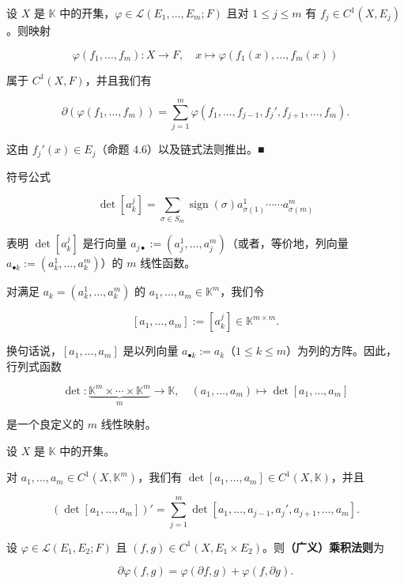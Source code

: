 \begin{corollary}

设 $ X $ 是 $ \mathbb{K} $ 中的开集，$ \varphi \in \mathcal{L}(E_1, \ldots, E_m; F) $ 且对 $ 1 \le j \le m $ 有 $ f_j \in C^1(X, E_j) $。则映射

\[
\varphi(f_1, \ldots, f_m) : X \to F , \quad x \mapsto \varphi(f_1(x), \ldots, f_m(x))
\]

属于 $ C^1(X, F) $，并且我们有

\[
\partial(\varphi(f_1, \ldots, f_m)) = \sum_{j=1}^{m}\varphi(f_1, \ldots, f_{j-1}, f_j', f_{j+1}, \ldots, f_m) .
\]

\proofhead
这由 $ f_j'(x) \in E_j $（命题 4.6）以及链式法则推出。\nobreak\hspace{0.35em}■
\end{corollary}

符号公式

\[
\det[a_k^j] = \sum_{\sigma \in S_m}\operatorname{sign}(\sigma)a_{\sigma(1)}^1 \cdots\cdots a_{\sigma(m)}^m
\]

表明 $ \det[a_k^j] $ 是行向量 $ a_{j\bullet} := (a_j^1, \ldots, a_j^m) $（或者，等价地，列向量 $ a_{\bullet k} := (a_k^1, \ldots, a_k^m) $）的 $ m $ 线性函数。

对满足 $ a_k = (a_k^1, \ldots, a_k^m) $ 的 $ a_1, \ldots, a_m \in \mathbb{K}^m $，我们令

\[
[a_1, \ldots, a_m] := [a_k^j] \in \mathbb{K}^{m \times m} .
\]

换句话说，$ [a_1, \ldots, a_m] $ 是以列向量 $ a_{\bullet k} := a_k $（$ 1 \le k \le m $）为列的方阵。因此，行列式函数

\[
\det : \underbrace{\mathbb{K}^m \times \cdots \times \mathbb{K}^m}_{m} \to \mathbb{K} , \quad (a_1, \ldots, a_m) \mapsto \det[a_1, \ldots, a_m]
\]

是一个良定义的 $ m $ 线性映射。

\begin{example}

设 $ X $ 是 $ \mathbb{K} $ 中的开集。

\begin{items}
\item

对 $ a_1, \ldots, a_m \in C^1(X, \mathbb{K}^m) $，我们有 $ \det[a_1, \ldots, a_m] \in C^1(X, \mathbb{K}) $，并且

\[
(\det[a_1, \ldots, a_m])' = \sum_{j=1}^{m}\det[a_1, \ldots, a_{j-1}, a_j', a_{j+1}, \ldots, a_m] .
\]
\item

设 $ \varphi \in \mathcal{L}(E_1, E_2; F) $ 且 $ (f, g) \in C^1(X, E_1 \times E_2) $。则\textbf{（广义）乘积法则}为

\[
\partial\varphi(f, g) = \varphi(\partial f, g) + \varphi(f, \partial g) .
\]
\end{items}

\end{example}

